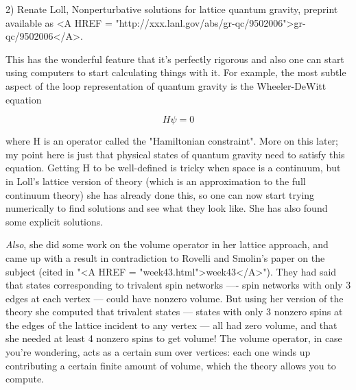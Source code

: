 2) Renate Loll, Nonperturbative solutions for lattice quantum gravity, 
preprint available as <A HREF = "http://xxx.lanl.gov/abs/gr-qc/9502006">gr-qc/9502006</A>.

This has the wonderful feature that it's perfectly rigorous and also
one can start using computers to start calculating things with it.
For example, the most subtle aspect of the loop representation of
quantum gravity is the Wheeler-DeWitt equation

$$
                                 H \psi  = 0
$$
    

where H is an operator called the "Hamiltonian constraint".  More on
this later; my point here is just that physical states of quantum
gravity need to satisfy this equation.  Getting H to be well-defined
is tricky when space is a continuum, but in Loll's lattice version of
theory (which is an approximation to the full continuum theory) she has
already done this, so one can now start trying numerically to find
solutions and see what they look like.  She has also found some explicit
solutions.  

\emph{Also}, she did some work on the volume operator in her lattice approach, 
and came up with a result in contradiction to Rovelli and Smolin's
paper on the subject (cited in "<A HREF = "week43.html">week43</A>").  They had said that states
corresponding to trivalent spin networks ---- spin networks with only
3 edges at each vertex --- could have nonzero volume.  But using her version 
of the theory she computed that trivalent states --- states with only 3 nonzero
spins at the edges of the lattice incident to any vertex --- all had
zero volume, and that she needed at least 4 nonzero spins to get
volume!  The volume operator, in case you're wondering, acts as a certain
sum over vertices: each one winds up contributing a certain finite
amount of volume, which the theory allows you to compute.


